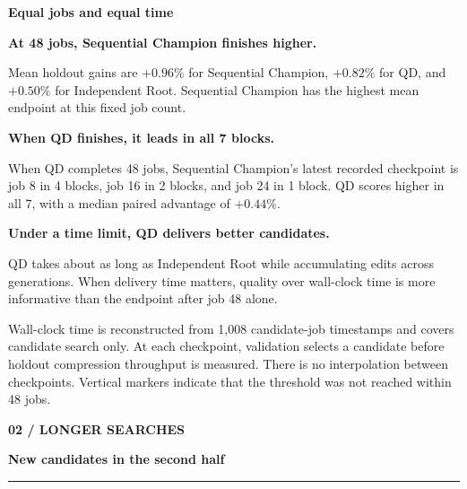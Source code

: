 \documentclass[10pt,a4paper]{article}
\newcommand{\pagetitle}[2]{%
  {\color{blue}\fontsize{11}{12}\selectfont\bfseries #1}\par
  {\color{ink}\fontsize{20}{22}\selectfont\bfseries #2}\vspace{3pt}\par
  {\color{line}\rule{\textwidth}{0.65pt}}\vspace{4pt}
}
\begin{document}
\begin{minipage}[t]{0.48\textwidth}
{\color{ink}\large\bfseries Equal jobs and equal time}\par
\small
\colorbox{orangepale}{\parbox{\dimexpr\linewidth-2\fboxsep\relax}{%
\vspace{3pt}\textbf{At 48 jobs, Sequential Champion finishes higher.}\par
Mean holdout gains are $+0.96\%$ for Sequential Champion, $+0.82\%$ for QD, and $+0.50\%$ for Independent Root. Sequential Champion has the highest mean endpoint at this fixed job count.\vspace{3pt}}}

\vspace{5pt}
\colorbox{bluepale}{\parbox{\dimexpr\linewidth-2\fboxsep\relax}{%
\vspace{3pt}\textbf{When QD finishes, it leads in all 7 blocks.}\par
When QD completes 48 jobs, Sequential Champion's latest recorded checkpoint is job 8 in 4 blocks, job 16 in 2 blocks, and job 24 in 1 block. QD scores higher in all 7, with a median paired advantage of $+0.44\%$.\vspace{3pt}}}

\vspace{5pt}
\colorbox{greenpale}{\parbox{\dimexpr\linewidth-2\fboxsep\relax}{%
\vspace{3pt}\textbf{Under a time limit, QD delivers better candidates.}\par
QD takes about as long as Independent Root while accumulating edits across generations. When delivery time matters, quality over wall-clock time is more informative than the endpoint after job 48 alone.\vspace{3pt}}}
\end{minipage}

\vspace{7pt}
{\color{muted}\scriptsize
Wall-clock time is reconstructed from 1,008 candidate-job timestamps and covers candidate search only. At each checkpoint, validation selects a candidate before holdout compression throughput is measured. There is no interpolation between checkpoints. Vertical markers indicate that the threshold was not reached within 48 jobs.}

\clearpage

\pagetitle{02 / LONGER SEARCHES}{New candidates in the second half}
\end{document}
